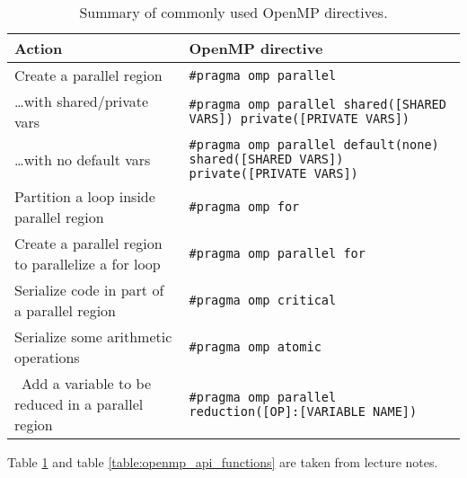 \begin{table}[H]
\caption{Summary of commonly used OpenMP directives.}
\centering
\begin{tabular}{>{\raggedright\arraybackslash}m{6cm}|m{10cm}}
\hline
\textbf{Action} & \textbf{OpenMP directive} \\
\hline
Create a parallel region & \texttt{\#pragma omp parallel} \\
\ldots with shared/private vars & \texttt{\#pragma omp parallel shared([SHARED VARS]) \newline private([PRIVATE VARS])} \\
\ldots with no default vars & \texttt{\#pragma omp parallel default(none) \newline shared([SHARED VARS]) private([PRIVATE VARS])} \\
Partition a loop inside parallel region & \texttt{\#pragma omp for} \\
Create a parallel region to parallelize a for loop & \texttt{\#pragma omp parallel for} \\
\hline \hline
Serialize code in part of a parallel region & \texttt{\#pragma omp critical} \\
Serialize some arithmetic operations & \texttt{\#pragma omp atomic} \\
\
Add a variable to be reduced in a parallel region & \texttt{\#pragma omp parallel reduction([OP]:[VARIABLE NAME])} \\
\hline
\end{tabular}
\label{table:openmp_directives}
\end{table}


Table \ref{table:openmp_directives} and table \ref{table:openmp_api_functions} are taken from lecture notes.